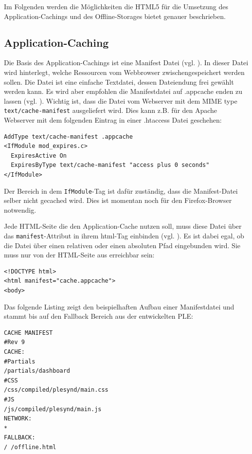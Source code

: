 Im Folgenden werden die Möglichkeiten die HTML5 für die Umsetzung des Application-Cachings und des Offline-Storages bietet genauer beschrieben.

\subsection{Application-Caching}\label{section:appcache}
Die Basis des Application-Cachings ist eine Manifest Datei (vgl. \cite{Bidelman2010}). In dieser Datei wird hinterlegt, welche Ressourcen vom Webbrowser zwischengespeichert werden sollen. Die Datei ist eine einfache Textdatei, dessen Dateiendung frei gewählt werden kann. Es wird aber empfohlen die Manifestdatei auf .appcache enden zu lassen (vgl. \cite{W3C2012}). Wichtig ist, dass die Datei vom Webserver mit dem MIME type \texttt{text/cache-manifest} ausgeliefert wird. Dies kann z.B. für den  Apache Webserver mit dem folgenden Eintrag in einer .htaccess Datei geschehen:
\begin{lstlisting}
AddType text/cache-manifest .appcache
<IfModule mod_expires.c>
  ExpiresActive On
  ExpiresByType text/cache-manifest "access plus 0 seconds"
</IfModule>
\end{lstlisting}
Der Bereich in dem \texttt{IfModule}-Tag ist dafür zuständig, dass die Manifest-Datei selber nicht gecached wird. Dies ist momentan noch für den Firefox-Browser notwendig.

Jede HTML-Seite die den Application-Cache nutzen soll, muss diese Datei über das \texttt{manifest}-Attribut in ihrem html-Tag einbinden (vgl. \cite{html5upandrunningchapter8}). Es ist dabei egal, ob die Datei über einen relativen oder einen absoluten Pfad eingebunden wird. Sie muss nur von der HTML-Seite aus erreichbar sein:
\begin{lstlisting}
<!DOCTYPE html>
<html manifest="cache.appcache">
<body>
\end{lstlisting}

Das folgende Listing zeigt den beispielhaften Aufbau einer Manifestdatei und stammt bis auf den Fallback Bereich aus der entwickelten PLE:
\begin{lstlisting}
CACHE MANIFEST
#Rev 9
CACHE:
#Partials
/partials/dashboard
#CSS
/css/compiled/plesynd/main.css
#JS
/js/compiled/plesynd/main.js
NETWORK:
*
FALLBACK:
/ /offline.html
\end{lstlisting}


